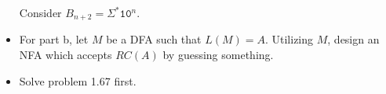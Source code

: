 \begin{itemize}
\begin{comment}
	\hint
	\end{comment}
	Consider $B_{n+2} = \Sigma^*\mathtt{1}\mathtt{0}^{n}$.
	
	
	\item[\hard 1.67]
	\begin{comment}
	Let the \bm{rotational closure} of language $A$ be $RC(A) = \{ yx \ | \ xy \in A \}$.
	\begin{itemize}
		\item[a.]
		Show that for any language $A$, we have $RC(A) = RC(RC(A))$.
		\item[b.]
		Show that the class of regular languages is closed under rotational closure.
	\end{itemize}
	\hint
	\end{comment}
	For part b, let $M$ be a DFA such that $L(M) = A$. Utilizing $M$, design an NFA which accepts $RC(A)$ by guessing something.
	
	
	\item[\hard 1.68] 
	\begin{comment}
	In the traditional method for cutting a deck of playing cards, the deck is arbitrarily
	split two parts, which are exchanged before reassembling the deck. In a more
	complex cut, called Scarne’s cut, the deck is broken into three parts and the middle
	part in placed first in the reassembly. We’ll take Scarne’s cut as the inspiration for
	an operation on languages. For a language $A$, let $CUT(A) = \{ yxz \ | \ xyz \in A \}$.
	\begin{itemize}
		\item[a.]
		Exhibit a language $B$ for which $CUT(B) \neq CUT(CUT(B))$.
		\item[b.]
		Show that the class of regular languages is closed under $CUT$.
	\end{itemize}
	\hint
	\end{comment}
	Solve problem 1.67 first.

	
\end{itemize}